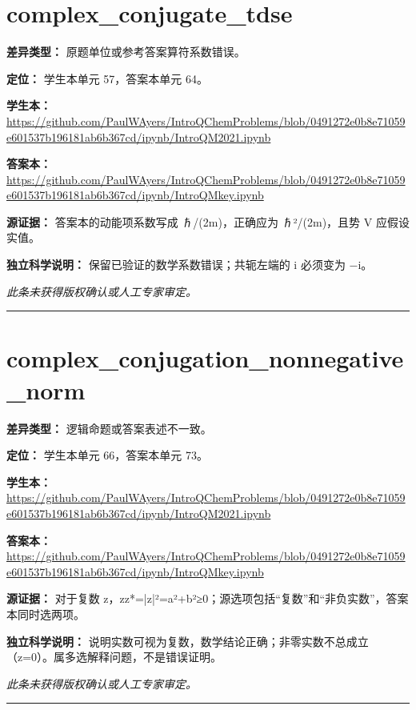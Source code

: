 \documentclass[UTF8,11pt,oneside,openany,fontset=none]{ctexbook}
\begin{document}
\section{complex\_conjugate\_tdse}
\noindent\textbf{差异类型：} 原题单位或参考答案算符系数错误。\par
\noindent\textbf{定位：} 学生本单元 57，答案本单元 64。\par
\noindent\textbf{学生本：} \url{https://github.com/PaulWAyers/IntroQChemProblems/blob/0491272e0b8e71059e601537b196181ab6b367cd/ipynb/IntroQM2021.ipynb}\par
\noindent\textbf{答案本：} \url{https://github.com/PaulWAyers/IntroQChemProblems/blob/0491272e0b8e71059e601537b196181ab6b367cd/ipynb/IntroQMkey.ipynb}\par
\noindent\textbf{源证据：} 答案本的动能项系数写成 ℏ/(2m)，正确应为 ℏ²/(2m)，且势 V 应假设实值。\par
\noindent\textbf{独立科学说明：} 保留已验证的数学系数错误；共轭左端的 i 必须变为 −i。\par
\medskip\noindent\textit{此条未获得版权确认或人工专家审定。}
\medskip\hrule\medskip
\section{complex\_conjugation\_nonnegative\_norm}
\noindent\textbf{差异类型：} 逻辑命题或答案表述不一致。\par
\noindent\textbf{定位：} 学生本单元 66，答案本单元 73。\par
\noindent\textbf{学生本：} \url{https://github.com/PaulWAyers/IntroQChemProblems/blob/0491272e0b8e71059e601537b196181ab6b367cd/ipynb/IntroQM2021.ipynb}\par
\noindent\textbf{答案本：} \url{https://github.com/PaulWAyers/IntroQChemProblems/blob/0491272e0b8e71059e601537b196181ab6b367cd/ipynb/IntroQMkey.ipynb}\par
\noindent\textbf{源证据：} 对于复数 z，zz*=|z|²=a²+b²≥0；源选项包括“复数”和“非负实数”，答案本同时选两项。\par
\noindent\textbf{独立科学说明：} 说明实数可视为复数，数学结论正确；非零实数不总成立（z=0）。属多选解释问题，不是错误证明。\par
\medskip\noindent\textit{此条未获得版权确认或人工专家审定。}
\medskip\hrule\medskip
\end{document}

